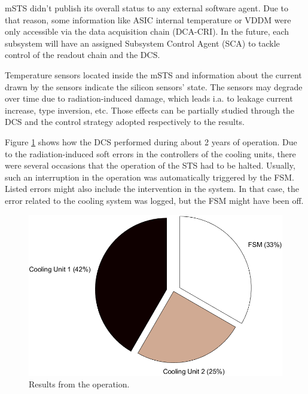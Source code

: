 \gls{mSTS} didn't publish its overall status to any external software agent. Due to that reason, some information like \gls{ASIC} internal temperature or VDDM were only accessible via the data acquisition chain (\gls{DCA}-\gls{CRI}). In the future, each subsystem will have an assigned Subsystem Control Agent (\gls{SCA}) to tackle control of the readout chain and the \gls{DCS}. 


Temperature sensors located inside the \gls{mSTS} and information about the current drawn by the sensors indicate the silicon sensors' state. The sensors may degrade over time due to radiation-induced damage,  which leads i.a. to leakage current increase, type inversion, etc. Those effects can be partially studied through the \gls{DCS} and the control strategy adopted respectively to the results.

Figure \ref{fig_dcs_results} shows how the \gls{DCS} performed during about 2 years of operation. Due to the radiation-induced soft errors in the controllers of the cooling units, there were several occasions that the operation of the \gls{STS} had to be halted. Usually, such an interruption in the operation was automatically triggered by the \gls{FSM}. Listed errors might also include the intervention in the system. In that case, the error related to the cooling system was logged, but the FSM might have been off.
\begin{figure}[!h]
\centering
\includegraphics[width=0.55\columnwidth]{Chapter6/DCS/images/DCSpie.png}
\caption{Results from the operation.}
\label{fig_dcs_results}
\end{figure}

